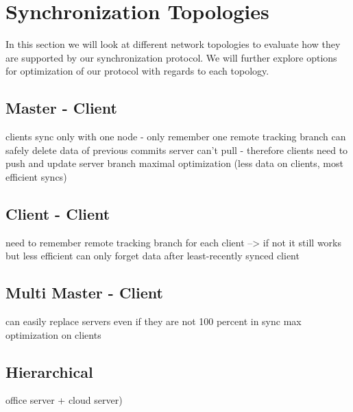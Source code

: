 
\section{Synchronization Topologies}
\label{sec:histo.topologies}

In this section we will look at different network topologies to evaluate how they are supported by our synchronization protocol.
We will further explore options for optimization of our protocol with regards to each topology.\\

\subsection{Master - Client}
clients sync only with one node - only remember one remote tracking branch
can safely delete data of previous commits
server can't pull - therefore clients need to push and update server branch
maximal optimization (less data on clients, most efficient syncs)

\subsection{Client - Client}
need to remember remote tracking branch for each client
--> if not it still works but less efficient
can only forget data after least-recently synced client

\subsection{Multi Master - Client}
can easily replace servers even if they are not 100 percent in sync
max optimization on clients

\subsection{Hierarchical}
office server + cloud server)
